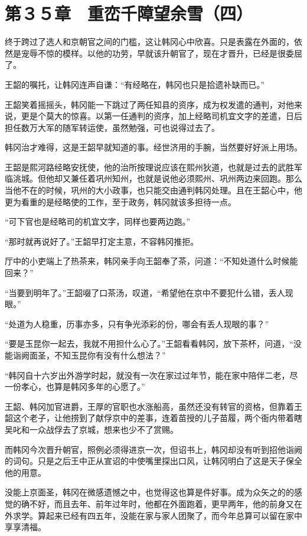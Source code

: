 \section{第３５章　重峦千障望余雪（四）}

终于跨过了选人和京朝官之间的门槛，这让韩冈心中欣喜。只是表露在外面的，依然是宠辱不惊的模样。以他的功劳，早就该升朝官了，现在才晋升，已经是很委屈了。

王韶的嘱托，让韩冈连声自谦：“有经略在，韩冈也只是拾遗补缺而已。”

王韶笑着摇摇头，韩冈能一下跳过了两任知县的资序，成为权发遣的通判，对他来说，更是个莫大的惊喜。以第一任通判的资序，加上经略司机宜文字的差遣，日后担任数万大军的随军转运使，虽然勉强，可也说得过去了。

韩冈治才难得，这是王韶早就知道的事。经世济用的手腕，当然要好好派上用场。

王韶是熙河路经略安抚使，他的治所按理说应该在熙州狄道，也就是过去的武胜军临洮城。但他却又兼任着巩州知州，也就是说他必须熙州、巩州两边来回跑。那么当他不在的时候，巩州的大小政事，也只能交由通判韩冈处理。且在王韶心中，他更为看重的是经略使的工作，至于政务，韩冈就该多担待一点。

“可下官也是经略司的机宜文字，同样也要两边跑。”

“那时就再说好了。”王韶早打定主意，不容韩冈推拒。

厅中的小吏端上了热茶来，韩冈亲手向王韶奉了茶，问道：“不知处道什么时候能回来？”

“当要到明年了。”王韶啜了口茶汤，叹道，“希望他在京中不要犯什么错，丢人现眼。”

“处道为人稳重，历事亦多，只有争光添彩的份，哪会有丢人现眼的事？”

“要是玉昆你一起去，我就不用担什么心了。”王韶看看韩冈，放下茶杯，问道，“没能诣阙面圣，不知玉昆你有没有什么想法？”

“韩冈自十六岁出外游学时起，就没有一次在家过过年节，能在家中陪伴二老，尽一份孝心，也算是韩冈多年的心愿了。”

王韶、韩冈加官进爵，王厚的官职也水涨船高，虽然还没有转官的资格，但靠着王韶这个老子，让他捞到了献俘京中的差事，连着苗授的儿子苗履，两个衙内带着瞎吴叱和一众战俘去了京城，想来也少不了赏赐。

而韩冈今次晋升朝官，照例必须得进京一次，但诏书上，韩冈却没有听到招他诣阙的词句。只是之后王中正从宣诏的中使嘴里探出口风，让韩冈明白了这是天子保全他的用意。

没能上京面圣，韩冈在微感遗憾之中，也觉得这也算是件好事。成为众矢之的的感觉的确不好，而且去年、前年过年时，他都在外面跑着，更早两年，他的前身又在外求学。算起来已经有四五年，没能在家与家人团聚了，而今年总算可以留在家中享享清福。

